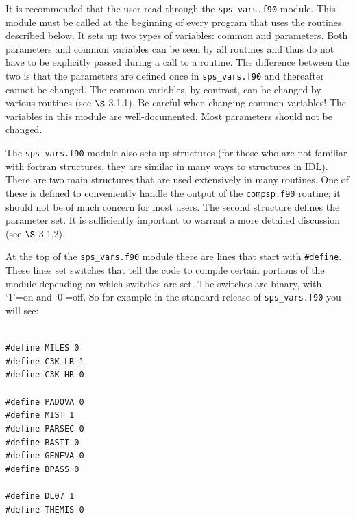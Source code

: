 \documentclass[]{article}
\begin{document}
\noindent
It is recommended that the user read through the \texttt{sps\_vars.f90} module.
This module must be called at the beginning of every program that uses the
routines described below.  It sets up two types of variables: common and
parameters.  Both parameters and common variables can be seen by all routines
and thus do not have to be explicitly passed during a call to a routine.  The
difference between the two is that the parameters are defined once in
\texttt{sps\_vars.f90} and thereafter cannot be changed.  The common variables,
by contrast, can be changed by various routines (see $\S$ 3.1.1).  Be careful
when changing common variables!  The variables in this module are
well-documented.  Most parameters should not be changed.

The \texttt{sps\_vars.f90} module also sets up structures (for those who are not
familiar with fortran structures, they are similar in many ways to structures in
IDL).  There are two main structures that are used extensively in many routines.
One of these is defined to conveniently handle the output of the
\texttt{compsp.f90} routine; it should not be of much concern for most users.
The second structure defines the parameter set.  It is sufficiently important to
warrant a more detailed discussion (see $\S$ 3.1.2).

\vspace{0.1in}
\vspace{0.1in}

\noindent
At the top of the \texttt{sps\_vars.f90} module there are lines that start with
\texttt{\#define}.  These lines set switches that tell the code to compile
certain portions of the module depending on which switches are set.  The
switches are binary, with `1'=on and `0'=off. So for example in the standard
release of \texttt{sps\_vars.f90} you will see:

\noindent \\
\noindent
\texttt{\#define MILES 0}\\
\texttt{\#define C3K\_LR 1}\\
\texttt{\#define C3K\_HR 0}\\
\\
\texttt{\#define PADOVA 0}\\
\texttt{\#define MIST 1}\\
\texttt{\#define PARSEC 0}\\
\texttt{\#define BASTI 0}\\
\texttt{\#define GENEVA 0}\\
\texttt{\#define BPASS 0}\\
\\
\texttt{\#define DL07 1}\\
\texttt{\#define THEMIS 0}\\
\end{document}

